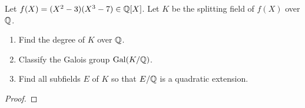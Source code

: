 \begin{problem}
Let $f(X)=(X^2-3)(X^3-7)\in\mathbb{Q}[X]$. Let $K$ be the splitting field of
$f(X)$ over $\mathbb{Q}$.
\begin{enumerate}[label=(\alph*)]
\item Find the degree of $K$ over $\mathbb{Q}$.
\item Classify the Galois group $\operatorname{Gal}(K/\mathbb{Q})$.
\item Find all subfields $E$ of $K$ so that $E/\mathbb{Q}$ is a quadratic
  extension.
\end{enumerate}
\end{problem}
\begin{proof}
\end{proof}


